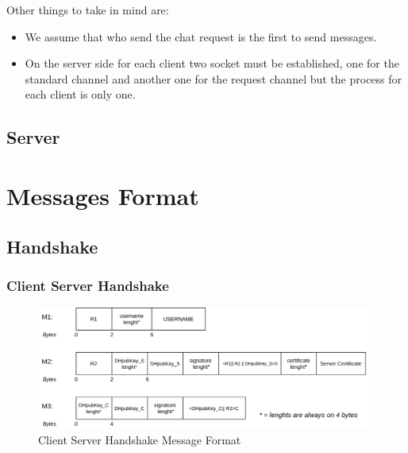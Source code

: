 \documentclass[11pt]{report}
\begin{document}
\noindent Other things to take in mind are:
\begin{itemize}
	\item We assume that who send the chat request is the first to send messages.
	\item On the server side for each client two socket must be established, one for the standard channel and another one for the request channel but the process for each client is only one.
\end{itemize}

\section{Server}

\chapter{Messages Format}

\section{Handshake}
\subsection*{Client Server Handshake}
\begin{figure}[H]
	\centering
	\includegraphics[scale=0.28]{img/AuthClientServer_messageFormat.png}
	\caption{Client Server Handshake Message Format}
	\label {img: FormatClientServer}
\end{figure}
\end{document}
